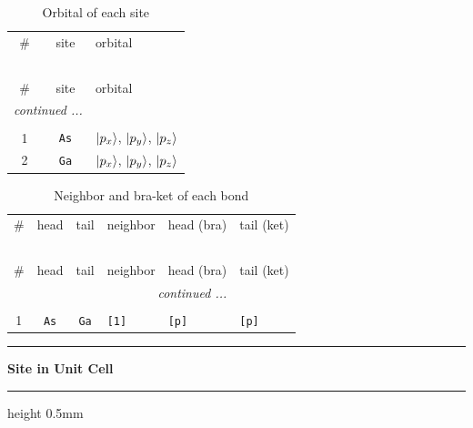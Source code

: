 \documentclass[fleqn,10pt,landscape]{jsarticle}
\begin{document}
\renewcommand{\arraystretch}{1.6}
\begin{longtable}[l]{ccl}
\captionsetup{justification=raggedright, singlelinecheck=off}
\caption{Orbital of each site}
 \\
 \hline \hline
\# & site & orbital \\ \hline \endfirsthead

\multicolumn{2}{l}{\tablename\ \thetable{}} \\
 \hline \hline
\# & site & orbital \\ \hline \endhead

 \hline \hline
\multicolumn{2}{r}{\footnotesize\it continued ...} \\ \endfoot

 \hline \hline
\multicolumn{2}{r}{} \\ \endlastfoot

1 & \texttt{As} & $\ket{p_{x}}$, $\ket{p_{y}}$, $\ket{p_{z}}$ \\ \hline
2 & \texttt{Ga} & $\ket{p_{x}}$, $\ket{p_{y}}$, $\ket{p_{z}}$ \\
\end{longtable}
\renewcommand{\arraystretch}{1.6}
\begin{longtable}[l]{ccclll}
\captionsetup{justification=raggedright, singlelinecheck=off}
\caption{Neighbor and bra-ket of each bond}
 \\
 \hline \hline
\# & head & tail & neighbor & head (bra) & tail (ket) \\ \hline \endfirsthead

\multicolumn{5}{l}{\tablename\ \thetable{}} \\
 \hline \hline
\# & head & tail & neighbor & head (bra) & tail (ket) \\ \hline \endhead

 \hline \hline
\multicolumn{5}{r}{\footnotesize\it continued ...} \\ \endfoot

 \hline \hline
\multicolumn{5}{r}{} \\ \endlastfoot

1 & \texttt{As} & \texttt{Ga} & \texttt{[1]} & \texttt{[p]} & \texttt{[p]} \\
\end{longtable}
\vspace{5mm}
\noindent \rule[0.5mm]{5mm}{0.5mm}\hspace{3mm}\textbf{Site in Unit Cell}\hspace{3mm}\leaders\hrule height 0.5mm\hfill\kern0pt
\vspace{3mm}
\end{document}
